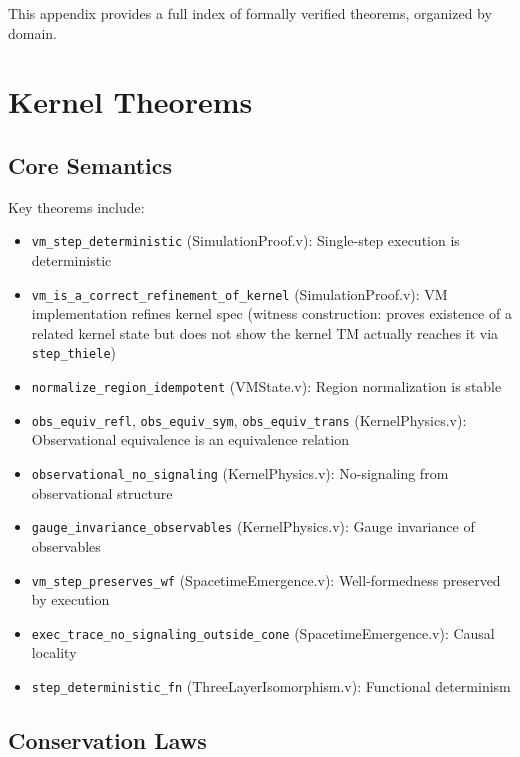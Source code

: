 This appendix provides a full index of formally verified theorems, organized by domain.

\section{Kernel Theorems}

\subsection{Core Semantics}

Key theorems include:
\begin{itemize}
    \item \texttt{vm\_step\_deterministic} (SimulationProof.v): Single-step execution is deterministic
    \item \texttt{vm\_is\_a\_correct\_refinement\_of\_kernel} (SimulationProof.v): VM implementation refines kernel spec (witness construction: proves existence of a related kernel state but does not show the kernel TM actually reaches it via \texttt{step\_thiele})
    \item \texttt{normalize\_region\_idempotent} (VMState.v): Region normalization is stable
    \item \texttt{obs\_equiv\_refl}, \texttt{obs\_equiv\_sym}, \texttt{obs\_equiv\_trans} (KernelPhysics.v): Observational equivalence is an equivalence relation
    \item \texttt{observational\_no\_signaling} (KernelPhysics.v): No-signaling from observational structure
    \item \texttt{gauge\_invariance\_observables} (KernelPhysics.v): Gauge invariance of observables
    \item \texttt{vm\_step\_preserves\_wf} (SpacetimeEmergence.v): Well-formedness preserved by execution
    \item \texttt{exec\_trace\_no\_signaling\_outside\_cone} (SpacetimeEmergence.v): Causal locality
    \item \texttt{step\_deterministic\_fn} (ThreeLayerIsomorphism.v): Functional determinism
\end{itemize}

\subsection{Conservation Laws}

